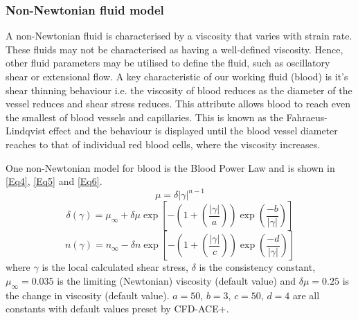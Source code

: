 \documentclass[journal,twoside,web]{ieeecolor}
\begin{document}
\subsubsection{Non-Newtonian fluid model}
A non-Newtonian fluid is characterised by a viscosity that varies with strain rate. These fluids may not be characterised as having a well-defined viscosity. Hence, other fluid parameters may be utilised to define the fluid, such as oscillatory shear or extensional flow. A key characteristic of our working fluid (blood) is it's shear thinning behaviour i.e. the viscosity of blood reduces as the diameter of the vessel reduces and shear stress reduces. This attribute allows blood to reach even the smallest of blood vessels and capillaries. This is known as the Fahraeus-Lindqvist effect and the behaviour is displayed until the blood vessel diameter reaches to that of individual red blood cells, where the viscosity increases.

One non-Newtonian model for blood is the Blood Power Law and is shown in \eqref{Eq4}, \eqref{Eq5} and \eqref{Eq6}.
\begin{equation}\label{Eq4}
    \mu = \delta \left|\gamma \right|^{n-1}
\end{equation}
\begin{equation}\label{Eq5}
    \delta \left(\gamma \right)= \mu_{\infty} + \delta \mu \exp\left[-\left(1 + \left(\frac{\left|\gamma\right|}{a}\right)\right)\exp\left(\frac{-b}{\left|\gamma\right|}\right)\right]
\end{equation}
\begin{equation}\label{Eq6}
    n\left(\gamma\right) = n_{\infty} - \delta n \exp\left[-\left(1 + \left(\frac{\left|\gamma\right|}{c}\right)\right)\exp\left(\frac{-d}{\left|\gamma\right|}\right)\right]
\end{equation}
where $\gamma$ is the local calculated shear stress, $\delta$ is the consistency constant, $\mu_{\infty} = 0.035$ is the limiting (Newtonian) viscosity (default value) and $\delta \mu = 0.25$ is the change in viscosity (default value). $a = 50$, $b = 3$, $c = 50$, $d = 4$ are all constants with default values preset by CFD-ACE+.
\end{document}
